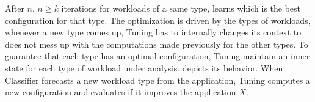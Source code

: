 After $n,\, n \geq k$ iterations for workloads of a same type, \name learns which is the best configuration for that
type. The optimization is driven by the types of workloads, whenever a new type comes up, Tuning has to internally
changes its context to does not mess up with the computations made previously for the other types.  To guarantee that
each type has an optimal configuration, Tuning maintain an inner state for each type of workload under analysis.
 depicts its behavior. When Classifier forecasts a new workload type from the application,
Tuning computes a new configuration and evaluates if it improves the application $X$.


